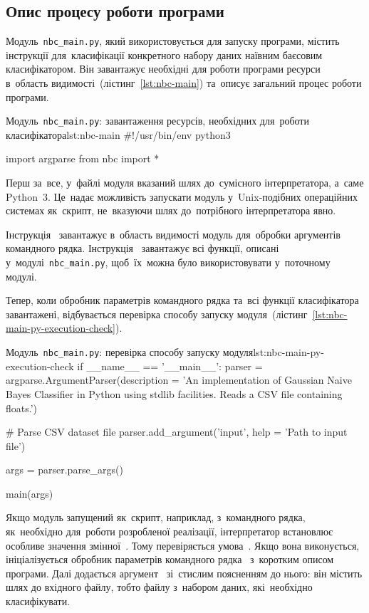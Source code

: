 \documentclass[
	a4paper,
	oneside,
	DIV = 12,
	fontsize = 13pt,
	headings = normal,
	numbers = endperiod,
	bibliography = totoc, %
]{scrartcl}
\theoremstyle{mythm}
\newcommand{\filename}[1]{\texttt{#1}}
\begin{document}
		\subsection{Опис процесу роботи програми}

			Модуль~\filename{nbc\_main.py}, який використовується для запуску програми, містить інструкції для~класифікації конкретного набору даних наївним баєсовим класифікатором. Він завантажує необхідні для роботи програми ресурси в~область видимості~(лістинг~\ref{lst:nbc-main}) та~описує загальний процес роботи програми.

			\begin{listingpython}{Модуль~\filename{nbc\_main.py}: завантаження ресурсів, необхідних для~роботи класифікатора}{lst:nbc-main}
				#!/usr/bin/env python3

				import argparse
				from nbc import *
			\end{listingpython}

			Перш за~все, у~файлі модуля вказаний шлях до~сумісного інтерпретатора, а~саме \textenglish{Python~3}. Це~надає можливість запускати модуль у~\textenglish{Unix}-подібних операційних системах як~скрипт, не~вказуючи шлях до~потрібного інтерпретатора явно.
			
			Інструкція~ завантажує в~область видимості модуль для~обробки аргументів командного рядка. Інструкція~ завантажує всі функції, описані у~модулі~\filename{nbc\_main.py}, щоб~їх~можна було використовувати у~поточному модулі. 

			Тепер, коли обробник параметрів командного рядка та~всі функції класифікатора завантажені, відбувається перевірка способу запуску модуля~(лістинг~\ref{lst:nbc-main-py-execution-check}). 

			\begin{listingpython}[toprule = 0pt, bottomrule = 0pt]{Модуль~\filename{nbc\_main.py}: перевірка способу запуску модуля}{lst:nbc-main-py-execution-check}
if __name__ == '__main__':
parser = argparse.ArgumentParser(description = 'An implementation of Gaussian Naive Bayes Classifier in Python using stdlib facilities. Reads a CSV file containing floats.')

# Parse CSV dataset file
parser.add_argument('input', help = 'Path to input file')

args = parser.parse_args()

main(args)
			\end{listingpython}

			Якщо модуль запущений як~скрипт, наприклад, з~командного рядка, як~необхідно для~роботи розробленої реалізації, інтерпретатор встановлює особливе значення змінної~. Тому перевіряється умова~. Якщо вона виконується, ініціалізується обробник параметрів командного рядка~ з~коротким описом програми. Далі додається аргумент~ зі~стислим поясненням до нього: він містить шлях до вхідного файлу, тобто файлу з~набором даних, які~необхідно класифікувати.
\end{document}
